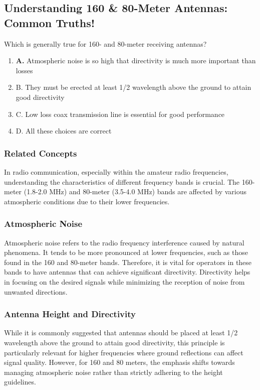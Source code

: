 \subsection{Understanding 160 \& 80-Meter Antennas: Common Truths!}

\begin{tcolorbox}[colback=gray!10, colframe=black, title=E9H02] 

Which is generally true for 160- and 80-meter receiving antennas?
\begin{enumerate}
    \item \textbf{A.} Atmospheric noise is so high that directivity is much more important than losses
    \item B. They must be erected at least 1/2 wavelength above the ground to attain good directivity
    \item C. Low loss coax transmission line is essential for good performance
    \item D. All these choices are correct
\end{enumerate} \end{tcolorbox}



\subsubsection{Related Concepts}

In radio communication, especially within the amateur radio frequencies, understanding the characteristics of different frequency bands is crucial. The 160-meter (1.8-2.0 MHz) and 80-meter (3.5-4.0 MHz) bands are affected by various atmospheric conditions due to their lower frequencies. 

\subsubsection{Atmospheric Noise}
Atmospheric noise refers to the radio frequency interference caused by natural phenomena. It tends to be more pronounced at lower frequencies, such as those found in the 160 and 80-meter bands. Therefore, it is vital for operators in these bands to have antennas that can achieve significant directivity. Directivity helps in focusing on the desired signals while minimizing the reception of noise from unwanted directions.

\subsubsection{Antenna Height and Directivity}
While it is commonly suggested that antennas should be placed at least 1/2 wavelength above the ground to attain good directivity, this principle is particularly relevant for higher frequencies where ground reflections can affect signal quality. However, for 160 and 80 meters, the emphasis shifts towards managing atmospheric noise rather than strictly adhering to the height guidelines.

